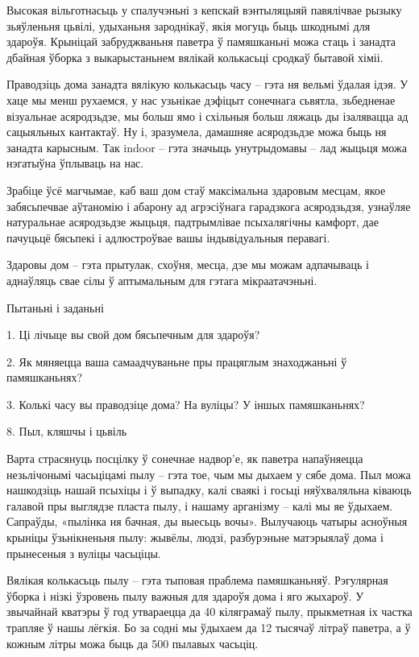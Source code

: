 Высокая вільготнасьць у спалучэньні з кепскай вэнтыляцыяй павялічвае рызыку зьяўленьня цьвілі, удыханьня зароднікаў, якія могуць быць шкоднымі для здароўя. Крыніцай забруджваньня паветра ў памяшканьні можа стаць і занадта дбайная ўборка з выкарыстаньнем вялікай колькасьці сродкаў бытавой хіміі.

Праводзіць дома занадта вялікую колькасьць часу – гэта ня вельмі ўдалая ідэя. У хаце мы менш рухаемся, у нас узьнікае дэфіцыт сонечнага сьвятла, зьбедненае візуальнае асяродзьдзе, мы больш ямо і схільныя больш ляжаць ды ізалявацца ад сацыяльных кантактаў. Ну і, зразумела, дамашняе асяродзьдзе можа быць ня занадта карысным. Так indoor – гэта значыць унутрыдомавы – лад жыцьця можа нэгатыўна ўплываць на нас.

Зрабіце ўсё магчымае, каб ваш дом стаў максімальна здаровым месцам, якое забясьпечвае аўтаномію і абарону ад агрэсіўнага гарадзкога асяродзьдзя, узнаўляе натуральнае асяродзьдзе жыцьця, падтрымлівае псыхалягічны камфорт, дае пачуцьцё бясьпекі і адлюстроўвае вашы індывідуальныя перавагі.

Здаровы дом – гэта прытулак, схоўня, месца, дзе мы можам адпачываць і аднаўляць свае сілы ў аптымальным для гэтага мікраатачэньні.

Пытаньні і заданьні

1. Ці лічыце вы свой дом бясьпечным для здароўя?

2. Як мяняецца ваша самаадчуваньне пры працяглым знаходжаньні ў памяшканьнях?

3. Колькі часу вы праводзіце дома? На вуліцы? У іншых памяшканьнях?


8. Пыл, кляшчы і цьвіль

Варта страсянуць посцілку ў сонечнае надвор'е, як паветра напаўняецца незьлічонымі часьціцамі пылу – гэта тое, чым мы дыхаем у сябе дома. Пыл можа нашкодзіць нашай псыхіцы і ў выпадку, калі сваякі і госьці няўхваляльна ківаюць галавой пры выглядзе пласта пылу, і нашаму арганізму – калі мы яе ўдыхаем. Сапраўды, «пылінка ня бачная, ды выесьць вочы». Вылучаюць чатыры асноўныя крыніцы ўзьнікненьня пылу: жывёлы, людзі, разбурэньне матэрыялаў дома і прынесеныя з вуліцы часьціцы.

Вялікая колькасьць пылу – гэта тыповая праблема памяшканьняў. Рэгулярная ўборка і нізкі ўзровень пылу важныя для здароўя дома і яго жыхароў. У звычайнай кватэры ў год утвараецца да 40 кіляграмаў пылу, прыкметная іх частка трапляе ў нашы лёгкія. Бо за содні мы ўдыхаем да 12 тысячаў літраў паветра, а ў кожным літры можа быць да 500 пылавых часьціц.

